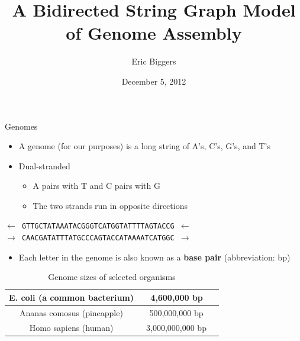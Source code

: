 \documentclass[xcolor=dvipsnames]{beamer}
\begin{document}
\title{A Bidirected String Graph Model of Genome Assembly}
\author{Eric Biggers}
\date{December 5, 2012}

\frame{\titlepage}

\begin{frame}{Genomes}
	\begin{itemize}
		\item A genome (for our purposes) is a long string of A's, C's, G's, and T's
		\item Dual-stranded
		\begin{itemize}
			\item A pairs with T and C pairs with G
			\item The two strands run in opposite directions
		\end{itemize}
	\end{itemize}
	\begin{center}
	{\tt $\leftarrow$ GTTGCTATAAATACGGGTCATGGTATTTTAGTACCG $\leftarrow$ \\}
	{\tt $\rightarrow$ CAACGATATTTATGCCCAGTACCATAAAATCATGGC $\rightarrow$}
	\end{center}
	\begin{itemize}
		\item Each letter in the genome is also known as a {\bf base pair}
		(abbreviation: bp)
	\end{itemize}
	\begin{table}[H]
		\caption{Genome sizes of selected organisms}
		\begin{tabular}{|c|c|c|}
			\hline
			E. coli (a common bacterium) &  ~4,600,000 bp \\
			\hline
			Ananas comosus (pineapple) &	~500,000,000 bp \\
			\hline
			Homo sapiens (human)       &  ~3,000,000,000 bp \\
			\hline
		\end{tabular}
	\end{table}
\end{frame}
\end{document}
